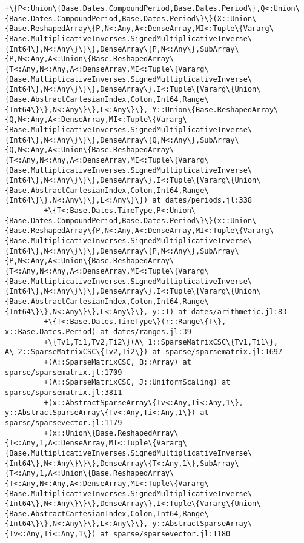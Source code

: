 \documentclass[11pt]{article}
\begin{document}
\begin{Verbatim}[commandchars=\\\{\}]
         +\{P<:Union\{Base.Dates.CompoundPeriod,Base.Dates.Period\},Q<:Union\{Base.Dates.CompoundPeriod,Base.Dates.Period\}\}(X::Union\{Base.ReshapedArray\{P,N<:Any,A<:DenseArray,MI<:Tuple\{Vararg\{Base.MultiplicativeInverses.SignedMultiplicativeInverse\{Int64\},N<:Any\}\}\},DenseArray\{P,N<:Any\},SubArray\{P,N<:Any,A<:Union\{Base.ReshapedArray\{T<:Any,N<:Any,A<:DenseArray,MI<:Tuple\{Vararg\{Base.MultiplicativeInverses.SignedMultiplicativeInverse\{Int64\},N<:Any\}\}\},DenseArray\},I<:Tuple\{Vararg\{Union\{Base.AbstractCartesianIndex,Colon,Int64,Range\{Int64\}\},N<:Any\}\},L<:Any\}\}, Y::Union\{Base.ReshapedArray\{Q,N<:Any,A<:DenseArray,MI<:Tuple\{Vararg\{Base.MultiplicativeInverses.SignedMultiplicativeInverse\{Int64\},N<:Any\}\}\},DenseArray\{Q,N<:Any\},SubArray\{Q,N<:Any,A<:Union\{Base.ReshapedArray\{T<:Any,N<:Any,A<:DenseArray,MI<:Tuple\{Vararg\{Base.MultiplicativeInverses.SignedMultiplicativeInverse\{Int64\},N<:Any\}\}\},DenseArray\},I<:Tuple\{Vararg\{Union\{Base.AbstractCartesianIndex,Colon,Int64,Range\{Int64\}\},N<:Any\}\},L<:Any\}\}) at dates/periods.jl:338
         +\{T<:Base.Dates.TimeType,P<:Union\{Base.Dates.CompoundPeriod,Base.Dates.Period\}\}(x::Union\{Base.ReshapedArray\{P,N<:Any,A<:DenseArray,MI<:Tuple\{Vararg\{Base.MultiplicativeInverses.SignedMultiplicativeInverse\{Int64\},N<:Any\}\}\},DenseArray\{P,N<:Any\},SubArray\{P,N<:Any,A<:Union\{Base.ReshapedArray\{T<:Any,N<:Any,A<:DenseArray,MI<:Tuple\{Vararg\{Base.MultiplicativeInverses.SignedMultiplicativeInverse\{Int64\},N<:Any\}\}\},DenseArray\},I<:Tuple\{Vararg\{Union\{Base.AbstractCartesianIndex,Colon,Int64,Range\{Int64\}\},N<:Any\}\},L<:Any\}\}, y::T) at dates/arithmetic.jl:83
         +\{T<:Base.Dates.TimeType\}(r::Range\{T\}, x::Base.Dates.Period) at dates/ranges.jl:39
         +\{Tv1,Ti1,Tv2,Ti2\}(A\_1::SparseMatrixCSC\{Tv1,Ti1\}, A\_2::SparseMatrixCSC\{Tv2,Ti2\}) at sparse/sparsematrix.jl:1697
         +(A::SparseMatrixCSC, B::Array) at sparse/sparsematrix.jl:1709
         +(A::SparseMatrixCSC, J::UniformScaling) at sparse/sparsematrix.jl:3811
         +(x::AbstractSparseArray\{Tv<:Any,Ti<:Any,1\}, y::AbstractSparseArray\{Tv<:Any,Ti<:Any,1\}) at sparse/sparsevector.jl:1179
         +(x::Union\{Base.ReshapedArray\{T<:Any,1,A<:DenseArray,MI<:Tuple\{Vararg\{Base.MultiplicativeInverses.SignedMultiplicativeInverse\{Int64\},N<:Any\}\}\},DenseArray\{T<:Any,1\},SubArray\{T<:Any,1,A<:Union\{Base.ReshapedArray\{T<:Any,N<:Any,A<:DenseArray,MI<:Tuple\{Vararg\{Base.MultiplicativeInverses.SignedMultiplicativeInverse\{Int64\},N<:Any\}\}\},DenseArray\},I<:Tuple\{Vararg\{Union\{Base.AbstractCartesianIndex,Colon,Int64,Range\{Int64\}\},N<:Any\}\},L<:Any\}\}, y::AbstractSparseArray\{Tv<:Any,Ti<:Any,1\}) at sparse/sparsevector.jl:1180

\end{Verbatim}
\end{document}
